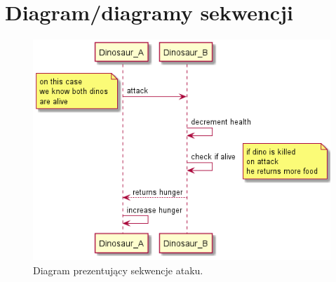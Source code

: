\newpage
\section{Diagram/diagramy sekwencji}

\begin{figure}[h!]
    \centering
    \includegraphics[scale=0.55]{images/sequence/sequence_attack.png}
    \caption{Diagram prezentujący sekwencje ataku.}
    \label{fig:sattack}
\end{figure}


